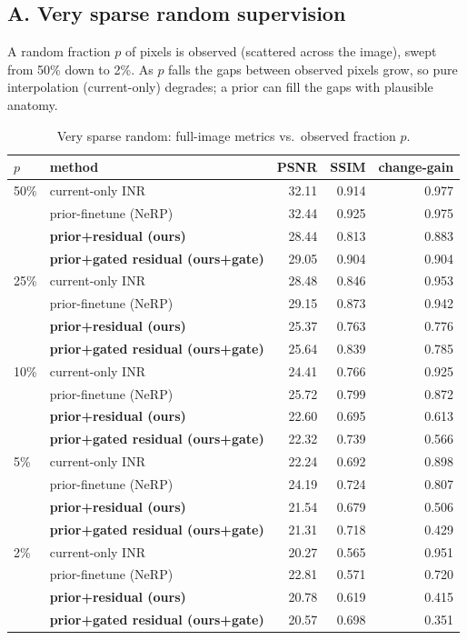 \documentclass[11pt]{article}
\begin{document}
\subsection*{A. Very sparse random supervision}
A random fraction $p$ of pixels is observed (scattered across the image), swept from 50\% down to 2\%. As $p$ falls the gaps between observed pixels grow, so pure interpolation (current-only) degrades; a prior can fill the gaps with plausible anatomy.
\begin{table}[H]\centering\caption{Very sparse random: full-image metrics vs.\ observed fraction $p$.}
\begin{tabular}{llrrr}\toprule
$p$ & method & PSNR & SSIM & change-gain \\ \midrule
50\% & current-only INR & 32.11 & 0.914 & 0.977 \\
 & prior-finetune (NeRP) & 32.44 & 0.925 & 0.975 \\
 & \textbf{prior+residual (ours)} & 28.44 & 0.813 & 0.883 \\
 & \textbf{prior+gated residual (ours+gate)} & 29.05 & 0.904 & 0.904 \\
\midrule
25\% & current-only INR & 28.48 & 0.846 & 0.953 \\
 & prior-finetune (NeRP) & 29.15 & 0.873 & 0.942 \\
 & \textbf{prior+residual (ours)} & 25.37 & 0.763 & 0.776 \\
 & \textbf{prior+gated residual (ours+gate)} & 25.64 & 0.839 & 0.785 \\
\midrule
10\% & current-only INR & 24.41 & 0.766 & 0.925 \\
 & prior-finetune (NeRP) & 25.72 & 0.799 & 0.872 \\
 & \textbf{prior+residual (ours)} & 22.60 & 0.695 & 0.613 \\
 & \textbf{prior+gated residual (ours+gate)} & 22.32 & 0.739 & 0.566 \\
\midrule
5\% & current-only INR & 22.24 & 0.692 & 0.898 \\
 & prior-finetune (NeRP) & 24.19 & 0.724 & 0.807 \\
 & \textbf{prior+residual (ours)} & 21.54 & 0.679 & 0.506 \\
 & \textbf{prior+gated residual (ours+gate)} & 21.31 & 0.718 & 0.429 \\
\midrule
2\% & current-only INR & 20.27 & 0.565 & 0.951 \\
 & prior-finetune (NeRP) & 22.81 & 0.571 & 0.720 \\
 & \textbf{prior+residual (ours)} & 20.78 & 0.619 & 0.415 \\
 & \textbf{prior+gated residual (ours+gate)} & 20.57 & 0.698 & 0.351 \\
\bottomrule\end{tabular}\end{table}
\end{document}
